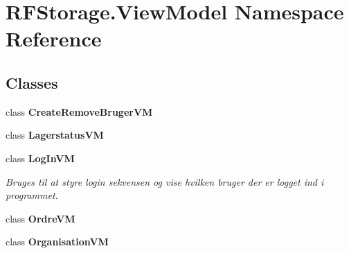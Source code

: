 \section{R\+F\+Storage.\+View\+Model Namespace Reference}
\label{namespace_r_f_storage_1_1_view_model}
\subsection*{Classes}
\begin{DoxyCompactItemize}
\item 
class \textbf{ Create\+Remove\+Bruger\+VM}
\item 
class \textbf{ Lagerstatus\+VM}
\item 
class \textbf{ Log\+In\+VM}
\begin{DoxyCompactList}\small\item\em Bruges til at styre login sekvensen og vise hvilken bruger der er logget ind i programmet. \end{DoxyCompactList}\item 
class \textbf{ Ordre\+VM}
\item 
class \textbf{ Organisation\+VM}
\end{DoxyCompactItemize}
